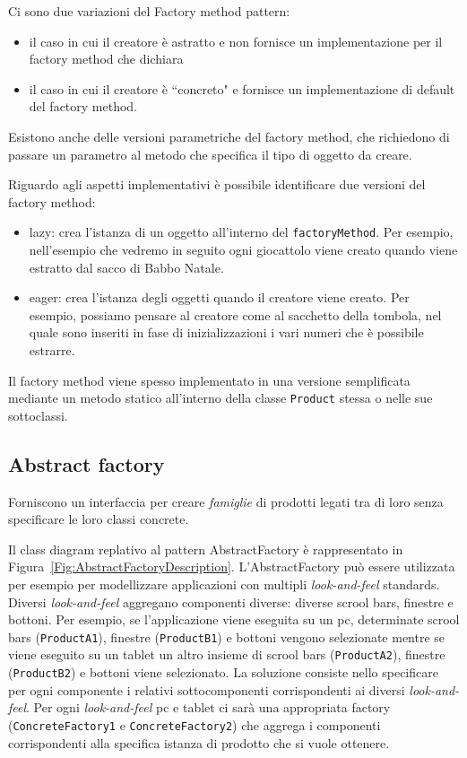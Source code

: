 \documentclass{article}
\begin{document}
Ci sono due variazioni del Factory method pattern:
\begin{itemize}
\item il caso in cui il creatore \`e astratto e non fornisce un implementazione per il factory method che dichiara
\item il caso in cui il creatore \`e ``concreto" e fornisce un implementazione di default del factory method.
\end{itemize}

Esistono anche delle versioni parametriche del factory method, che richiedono di passare un parametro al metodo che specifica il tipo di oggetto da creare.

Riguardo agli aspetti implementativi \`e possibile identificare due versioni del factory method:
\begin{itemize}
\item  lazy: crea l'istanza di un oggetto all'interno del \texttt{factoryMethod}. Per esempio, nell'esempio che vedremo in seguito ogni giocattolo viene creato quando viene estratto dal sacco di Babbo Natale.
\item eager: crea l'istanza degli oggetti quando il creatore viene creato. Per esempio, possiamo pensare al creatore come al sacchetto della tombola, nel quale sono inseriti in fase di inizializzazioni i vari numeri che \`e possibile estrarre.
\end{itemize}

Il factory method viene spesso implementato in una versione semplificata mediante un metodo statico all'interno della classe \texttt{Product} stessa o nelle sue sottoclassi. 


\subsection{Abstract factory}
\begin{framed}
Forniscono un interfaccia per creare \emph{famiglie} di prodotti legati tra di loro senza specificare le loro classi concrete.
\end{framed}

Il class diagram replativo al pattern AbstractFactory \`e rappresentato in Figura~\ref{Fig:AbstractFactoryDescription}. L'AbstractFactory pu\`o essere utilizzata per esempio per modellizzare applicazioni con multipli \emph{look-and-feel} standards. Diversi \emph{look-and-feel} aggregano componenti diverse: diverse scrool bars, finestre e bottoni. Per esempio, se l'applicazione viene eseguita su un pc, determinate scrool bars (\texttt{ProductA1}), finestre (\texttt{ProductB1}) e bottoni vengono selezionate mentre se viene eseguito su un tablet un altro insieme di scrool bars (\texttt{ProductA2}), finestre (\texttt{ProductB2}) e bottoni viene selezionato. La soluzione consiste nello specificare per ogni componente i relativi sottocomponenti corrispondenti ai diversi \emph{look-and-feel}. Per ogni \emph{look-and-feel} pc e tablet ci sar\`a una appropriata factory (\texttt{ConcreteFactory1} e \texttt{ConcreteFactory2}) che aggrega i componenti corrispondenti alla specifica istanza di prodotto che si vuole ottenere.
\end{document}
